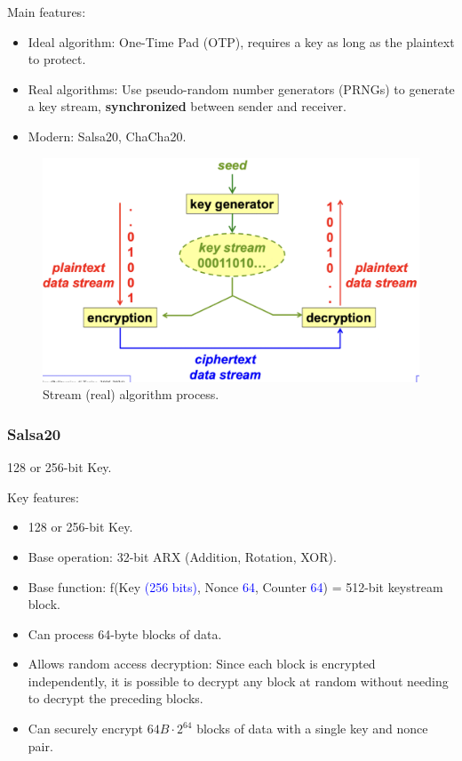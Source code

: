 \begin{multicols}{2}


    Main features:
    \begin{itemize}
        \item Ideal algorithm: One-Time Pad (OTP), requires a key as long as the plaintext to protect.
        \item Real algorithms: Use pseudo-random number generators (PRNGs) to generate a key stream, \textbf{synchronized} between sender and receiver.
        \item Modern: Salsa20, ChaCha20.
    \end{itemize}
\columnbreak

\begin{figure}[H]
    \centering
    \includegraphics[width=\linewidth]{Images/Cryptography/Stream_Cipher.png}
    \caption{Stream (real) algorithm process.}
\end{figure}
\end{multicols}

\subsubsection{Salsa20}
\begin{center}
    128 or 256-bit Key.
\end{center}

Key features:
\begin{itemize}
    \item 128 or 256-bit Key.
    \item Base operation: 32-bit ARX (Addition, Rotation, XOR).
    \item Base function: f(Key \textcolor{Blue}{(256 bits)}, Nonce \textcolor{Blue}{ 64}, Counter \textcolor{Blue}{ 64}) = 512-bit keystream block.
    \item Can process 64-byte blocks of data.
    \item Allows random access decryption: Since each block is encrypted independently, it is possible to decrypt any block at random without needing to decrypt the preceding blocks.
    \item Can securely encrypt $64B \cdot 2^{64}$ blocks of data with a single key and nonce pair.
\end{itemize}

